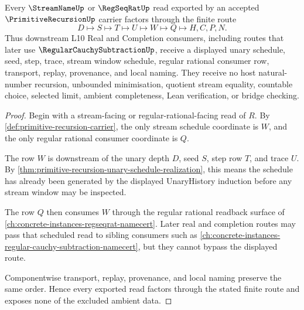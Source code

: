\begin{theorem}
\label{thm:primitive-recursion-stream-schedule-handoff}
Every $\StreamNameUp$ or $\RegSeqRatUp$ read exported by an accepted $\PrimitiveRecursionUp$ carrier factors through the finite route
$$
D \longmapsto S \longmapsto T \longmapsto U \longmapsto W \longmapsto Q \longmapsto H,C,P,N .
$$
Thus downstream L10 Real and Completion consumers, including routes that later use $\RegularCauchySubtractionUp$, receive a displayed unary schedule, seed, step, trace, stream window schedule, regular rational consumer row, transport, replay, provenance, and local naming. They receive no host natural-number recursion, unbounded minimisation, quotient stream equality, countable choice, selected limit, ambient completeness, Lean verification, or bridge checking.
\end{theorem}
\begin{proof}
Begin with a stream-facing or regular-rational-facing read of $R$. By \autoref{def:primitive-recursion-carrier}, the only stream schedule coordinate is $W$, and the only regular rational consumer coordinate is $Q$.

The row $W$ is downstream of the unary depth $D$, seed $S$, step row $T$, and trace $U$. By \autoref{thm:primitive-recursion-unary-schedule-realization}, this means the schedule has already been generated by the displayed UnaryHistory induction before any stream window may be inspected.

The row $Q$ then consumes $W$ through the regular rational readback surface of \autoref{ch:concrete-instances-regseqrat-namecert}. Later real and completion routes may pass that scheduled read to sibling consumers such as \autoref{ch:concrete-instances-regular-cauchy-subtraction-namecert}, but they cannot bypass the displayed route.

Componentwise transport, replay, provenance, and local naming preserve the same order. Hence every exported read factors through the stated finite route and exposes none of the excluded ambient data.
\end{proof}

